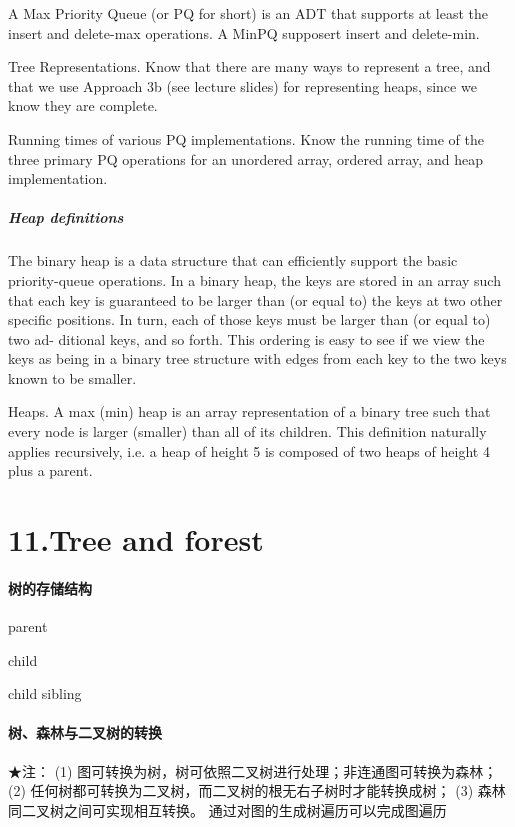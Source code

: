 \documentclass[UTF8]{ctexart}
\begin{document}
A Max Priority Queue (or PQ for short) is an ADT that supports at least the insert and delete-max operations. A MinPQ supposert insert and delete-min.

Tree Representations. Know that there are many ways to represent a tree, and that we use Approach 3b (see lecture slides) for representing heaps, since we know they are complete.

Running times of various PQ implementations. Know the running time of the three primary PQ operations for an unordered array, ordered array, and heap implementation.

\subparagraph{Heap definitions}

The binary heap is a data structure that can efficiently support the basic priority-queue operations. 
In a binary heap, the keys are stored in an array such that each key is guaranteed to be larger than 
(or equal to) the keys at two other specific positions. 
In turn, each of those keys must be larger than (or equal to) two ad- ditional keys, and so forth. 
This ordering is easy to see if we view the keys as being in a binary tree structure 
with edges from each key to the two keys known to be smaller.

Heaps. A max (min) heap is an array representation of a binary tree such that every node is larger (smaller) than all of its children. This definition naturally applies recursively, i.e. a heap of height 5 is composed of two heaps of height 4 plus a parent.




\newpage
\section*{11.Tree and forest}
\paragraph{树的存储结构}

parent 

child 

child sibling




\paragraph{树、森林与二叉树的转换}

★注：
(1) 图可转换为树，树可依照二叉树进行处理；非连通图可转换为森林；
(2) 任何树都可转换为二叉树，而二叉树的根无右子树时才能转换成树；
(3) 森林同二叉树之间可实现相互转换。
通过对图的生成树遍历可以完成图遍历
\end{document}
